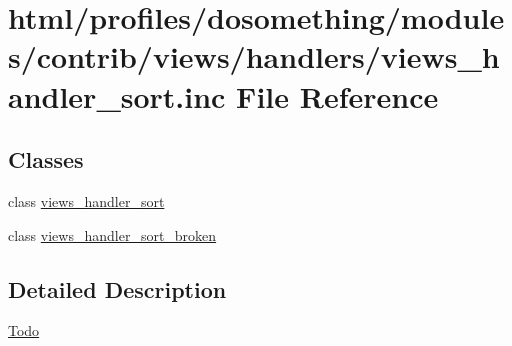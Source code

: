\hypertarget{views__handler__sort_8inc}{
\section{html/profiles/dosomething/modules/contrib/views/handlers/views\_\-handler\_\-sort.inc File Reference}
\label{views__handler__sort_8inc}
}
\subsection*{Classes}
\begin{DoxyCompactItemize}
\item 
class \hyperlink{classviews__handler__sort}{views\_\-handler\_\-sort}
\item 
class \hyperlink{classviews__handler__sort__broken}{views\_\-handler\_\-sort\_\-broken}
\end{DoxyCompactItemize}


\subsection{Detailed Description}
\begin{Desc}
\item[\hyperlink{todo__todo000075}{Todo}]\end{Desc}
